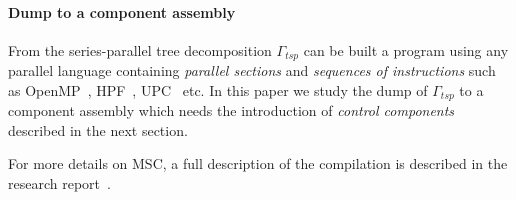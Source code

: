\paragraph{Dump to a component assembly} From the series-parallel tree decomposition $\Gamma_{tsp}$ can be built a program using any parallel language containing \emph{parallel sections} and \emph{sequences of instructions} such as OpenMP~\cite{660313}, HPF~\cite{219857}, UPC~\cite{El-Ghazawi:2006:UUP:1188455.1188483} etc. In this paper we study the dump of $\Gamma_{tsp}$ to a component assembly which needs the introduction of \emph{control components} described in the next section.

For more details on MSC, a full description of the compilation is described in the research report~\cite{}.


